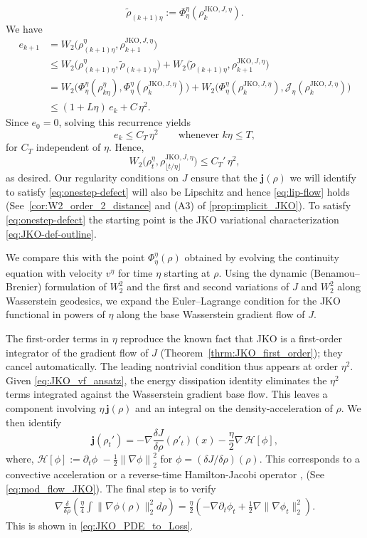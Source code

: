 \documentclass[reqno,11pt,letterpaper]{amsart}
\theoremstyle{plain}
\theoremstyle{definition}
\theoremstyle{remark}
\newcommand{\wagrad}{\nabla \frac{\delta J}{\delta \rho}}
\begin{document}
\[
\tilde\rho_{(k+1)\eta} := \Phi_\eta^\eta(\rho_k^{\mathrm{JKO},J,\eta}).
\]
We have 
\begin{align*}
e_{k+1}
&= W_2\big(\rho_{(k+1)\eta}^\eta,\rho_{k+1}^{\mathrm{JKO},J,\eta}\big)\\
&\le W_2\big(\rho_{(k+1)\eta}^\eta,\tilde\rho_{(k+1)\eta}\big)
    + W_2\big(\tilde\rho_{(k+1)\eta},\rho_{k+1}^{\mathrm{JKO},J,\eta}\big)\\
&= W_2\big(\Phi_\eta^\eta(\rho_{k\eta}^\eta),\Phi_\eta^\eta(\rho_k^{\mathrm{JKO},J,\eta})\big)
    + W_2\big(\Phi_\eta^\eta(\rho_k^{\mathrm{JKO},J,\eta}),\mathcal J_\eta(\rho_k^{\mathrm{JKO},J,\eta})\big)\\
&\le (1 + L\eta)\,e_k + C\,\eta^2.
\end{align*}
Since $e_0 = 0$, solving this recurrence yields
\[
e_k \le C_T\,\eta^2
\qquad\text{whenever } k\eta \le T,
\]
for $C_T$ independent of $\eta$. Hence, 
\[
W_2\big(\rho_t^\eta,\rho_{\lfloor t/\eta\rfloor}^{\mathrm{JKO},J,\eta}\big)
\le C_T'\,\eta^2,
\]
as desired. Our regularity conditions on $J$ ensure that the ${\bm j} (\rho)$ we will identify to satisfy \eqref{eq:onestep-defect} will also be Lipschitz and hence \eqref{eq:lip-flow} holds (See~\ref{cor:W2_order_2_distance} and (A3) of \ref{prop:implicit_JKO}). To satisfy \eqref{eq:onestep-defect} the starting point is the JKO variational characterization \eqref{eq:JKO-def-outline}.

We compare this with the point $\Phi_\eta^\eta(\rho)$ obtained by evolving the continuity equation with velocity $v^\eta$ for time $\eta$ starting at $\rho$. Using the dynamic (Benamou--Brenier) formulation of $W_2^2$ and the first and second variations of $J$ and $W_2^2$ along Wasserstein geodesics, we expand the Euler--Lagrange condition for the JKO functional in powers of $\eta$ along the base Wasserstein gradient flow of $J$.

The first-order terms in $\eta$ reproduce the known fact that JKO is a first-order integrator of the gradient flow of $J$ (Theorem~\ref{thrm:JKO_first_order}); they cancel automatically. The leading nontrivial condition thus appears at order $\eta^2$. Given \eqref{eq:JKO_vf_ansatz}, the energy dissipation identity eliminates the $\eta^2$ terms integrated against the Wasserstein gradient base flow. This leaves a component involving $\eta \,\bm{j}(\rho)$ and an integral on the density-acceleration of $\rho$. We then identify
\[
\bm{j}(\rho_t') = - \wagrad (\rho'_{t})(x) - \frac{\eta}{2} \nabla \,\mathcal{H}[\phi],
\]
where, $\mathcal{H}[\phi] := \partial_{t} \phi \,\, - \frac{1}{2} \left\lVert \nabla \phi \right\rVert_{2}^{2}$ for $\phi = (\delta J/\delta \rho )(\rho)$. This corresponds to a convective acceleration or a reverse-time Hamilton-Jacobi operator \cite{reverseHJ}, (See \eqref{eq:mod_flow_JKO}). The final step is to verify 
\begin{align*}
\nabla \frac{\delta}{\delta \rho} \left( \frac{\eta}{4} \int \lVert \nabla \phi(\rho) \rVert_{2}^{2} d \rho
    \right) =
    \frac{\eta}{2} \left( -\nabla \partial_{t} \phi_{t} + \frac{1}{2} \nabla \lVert \nabla \phi_{t} \rVert_{2}^{2} \right).
\end{align*}
This is shown in \eqref{eq:JKO_PDE_to_Loss}.\\
\end{document}
